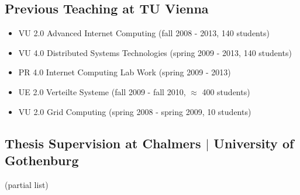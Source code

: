 \documentclass[paper=letter,fontsize=11pt]{scrartcl} %
\begin{document}
\subsection*{Previous Teaching at TU Vienna}
\begin{itemize}
  \item VU 2.0 Advanced Internet Computing (fall 2008 - 2013, 140 students)
  \item VU 4.0 Distributed Systems Technologies (spring 2009 - 2013, 140 students)
  \item PR 4.0 Internet Computing Lab Work (spring 2009 - 2013)
  \item UE 2.0 Verteilte Systeme (fall 2009 - fall 2010, $\approx$ 400 students)
  \item VU 2.0 Grid Computing (spring 2008 - spring 2009, 10 students)
\end{itemize}

\subsection*{Thesis Supervision at Chalmers $|$ University of Gothenburg}

(partial list)
\end{document}
